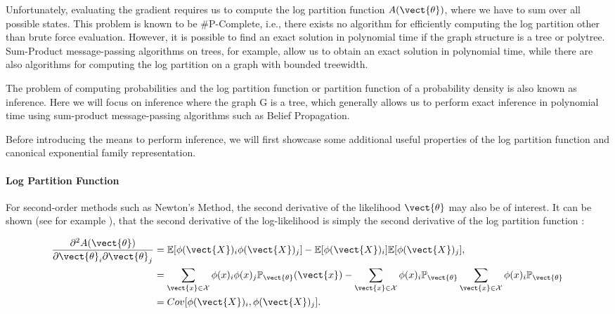     Unfortunately, evaluating the gradient requires us to compute the log partition function $A(\vect{\theta})$, where we have to sum over all possible states.
    This problem is known to be \#P-Complete, i.e., there exists no algorithm for efficiently computing the log partition other than brute force evaluation.
    However, it is possible to find an exact solution in polynomial time if the graph structure is a tree or polytree.
    Sum-Product message-passing algorithms on trees, for example, allow us to obtain an exact solution in polynomial time, while there are also algorithms for computing the log partition on a graph with bounded treewidth\cite{berg2014learning}.

    The problem of computing probabilities and the log partition function or partition function of a probability density is also known as inference.
    Here we will focus on inference where the graph G is a tree, which generally allows us to perform exact inference in polynomial time using sum-product message-passing algorithms such as Belief Propagation.

    Before introducing the means to perform inference, we will first showcase some additional useful properties of the log partition function and canonical exponential family representation.
    
    \paragraph*{Log Partition Function}
    For second-order methods such as Newton's Method, the second derivative of the likelihood \wrt $\vect{\theta}$ may also be of interest.
    It can be shown (see for example \cite{piatkowski2018exponential}), that the second derivative of the log-likelihood is simply the second derivative of the log partition function :

    \begin{equation}
        \label{eq:sparsefish}
        \begin{split}
        \frac{\partial^2 A(\vect{\theta})}{\partial \vect{\theta}_i \partial \vect{\theta}_j} &= \mathbb{E}[\phi(\vect{X})_i \phi(\vect{X})_j] - \mathbb{E}[\phi(\vect{X})_i] \mathbb{E}[\phi(\vect{X})_j], \\
        &= \sum_{\vect{x} \in \mathcal{X}} \phi(x)_i \phi(x)_j \mathbb{P}_{\vect{\theta}}(\vect{x}) - \sum_{\vect{x} \in \mathcal{X}} \phi(x)_i \mathbb{P}_{\vect{\theta}} \sum_{\vect{x} \in \mathcal{X}} \phi(x)_i  \mathbb{P}_{\vect{\theta}} \\
        &= Cov[\phi(\vect{X})_i, \phi(\vect{X})_j].
        \end{split}
    \end{equation}


